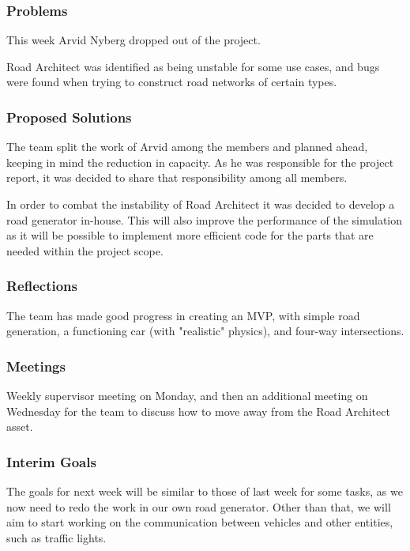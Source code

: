 \subsubsection{Problems}
    This week Arvid Nyberg dropped out of the project.

    Road Architect was identified as being unstable for some use cases, and bugs were found when trying to construct road networks of certain types.

\subsubsection{Proposed Solutions}
    The team split the work of Arvid among the members and planned ahead, keeping in mind the reduction in capacity. As he was responsible for the project report, it was decided to share that responsibility among all members.

    In order to combat the instability of Road Architect it was decided to develop a road generator in-house. This will also improve the performance of the simulation as it will be possible to implement more efficient code for the parts that are needed within the project scope.


\subsubsection{Reflections}
    The team has made good progress in creating an MVP, with simple road generation, a functioning car (with "realistic" physics), and four-way intersections.

\subsubsection{Meetings}
    Weekly supervisor meeting on Monday, and then an additional meeting on Wednesday for the team to discuss how to move away from the Road Architect asset.

\subsubsection{Interim Goals}
    The goals for next week will be similar to those of last week for some tasks, as we now need to redo the work in our own road generator. Other than that, we will aim to start working on the communication between vehicles and other entities, such as traffic lights.

